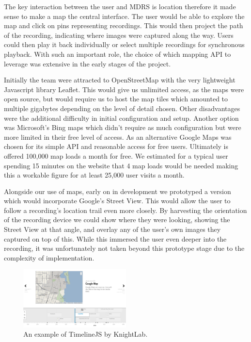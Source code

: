 \documentclass{l3proj}
\begin{document}
The key interaction between the user and MDRS is location therefore it made
sense to make a map the central interface. The user would be able to explore the
map and click on pins representing recordings. This would then project the path
of the recording, indicating where images were captured along the way. Users
could then play it back individually or select multiple recordings for
synchronous playback. With such an important role, the choice of which mapping
API to leverage was extensive in the early stages of the project.

Initially the team were attracted to OpenStreetMap with the very lightweight
Javascript library Leaflet. This would give us unlimited access, as the maps
were open source, but would require us to host the map tiles which amounted to
multiple gigabytes depending on the level of detail chosen. Other disadvantages
were the additional difficulty in initial configuration and setup. Another
option was Microsoft’s Bing maps which didn’t require as much configuration but
were more limited in their free level of access. As an alternative Google Maps
was chosen for its simple API and reasonable access for free users. Ultimately
is offered 100,000 map loads a month for free. We estimated for a typical user
spending 15 minutes on the website that 4 map loads would be needed making this
a workable figure for at least 25,000 user visits a month.

Alongside our use of maps, early on in development we prototyped a version which would incorporate Google's Street View. This would allow the user to follow a recording's location trail even more closely. By harvesting the orientation of the recording device we could show where they were looking, showing the Street View at that angle, and overlay any of the user's own images they captured on top of this. While this immersed the user even deeper into the recording, it was unfortunately not taken beyond this prototype stage due to the complexity of implementation.

\begin{figure}[ht!]
  \centering
\includegraphics[width=0.5\textwidth]{images/timeline-example.png}
\caption{An example of TimelineJS by KnightLab.}
\end{figure}
\end{document}
